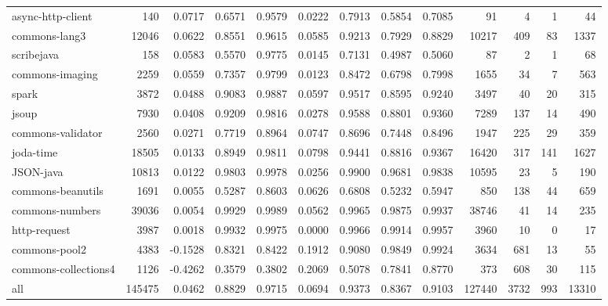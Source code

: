 \begin{table*}
\begin{tabular}{lrrrrrrrrrrrr}
      async-http-client &     140 &      0.0717 &  0.6571 &     0.9579 &     0.0222 &  0.7913 &     0.5854 &   0.7085 &      91 &     4 &    1 &     44 \\
          commons-lang3 &   12046 &      0.0622 &  0.8551 &     0.9615 &     0.0585 &  0.9213 &     0.7929 &   0.8829 &   10217 &   409 &   83 &   1337 \\
             scribejava &     158 &      0.0583 &  0.5570 &     0.9775 &     0.0145 &  0.7131 &     0.4987 &   0.5060 &      87 &     2 &    1 &     68 \\
        commons-imaging &    2259 &      0.0559 &  0.7357 &     0.9799 &     0.0123 &  0.8472 &     0.6798 &   0.7998 &    1655 &    34 &    7 &    563 \\
                  spark &    3872 &      0.0488 &  0.9083 &     0.9887 &     0.0597 &  0.9517 &     0.8595 &   0.9240 &    3497 &    40 &   20 &    315 \\
                  jsoup &    7930 &      0.0408 &  0.9209 &     0.9816 &     0.0278 &  0.9588 &     0.8801 &   0.9360 &    7289 &   137 &   14 &    490 \\
      commons-validator &    2560 &      0.0271 &  0.7719 &     0.8964 &     0.0747 &  0.8696 &     0.7448 &   0.8496 &    1947 &   225 &   29 &    359 \\
              joda-time &   18505 &      0.0133 &  0.8949 &     0.9811 &     0.0798 &  0.9441 &     0.8816 &   0.9367 &   16420 &   317 &  141 &   1627 \\
              JSON-java &   10813 &      0.0122 &  0.9803 &     0.9978 &     0.0256 &  0.9900 &     0.9681 &   0.9838 &   10595 &    23 &    5 &    190 \\
      commons-beanutils &    1691 &      0.0055 &  0.5287 &     0.8603 &     0.0626 &  0.6808 &     0.5232 &   0.5947 &     850 &   138 &   44 &    659 \\
        commons-numbers &   39036 &      0.0054 &  0.9929 &     0.9989 &     0.0562 &  0.9965 &     0.9875 &   0.9937 &   38746 &    41 &   14 &    235 \\
           http-request &    3987 &      0.0018 &  0.9932 &     0.9975 &     0.0000 &  0.9966 &     0.9914 &   0.9957 &    3960 &    10 &    0 &     17 \\
          commons-pool2 &    4383 &     -0.1528 &  0.8321 &     0.8422 &     0.1912 &  0.9080 &     0.9849 &   0.9924 &    3634 &   681 &   13 &     55 \\
   commons-collections4 &    1126 &     -0.4262 &  0.3579 &     0.3802 &     0.2069 &  0.5078 &     0.7841 &   0.8770 &     373 &   608 &   30 &    115 \\
                    all &  145475 &      0.0462 &  0.8829 &     0.9715 &     0.0694 &  0.9373 &     0.8367 &   0.9103 &  127440 &  3732 &  993 &  13310 \\
\bottomrule
\end{tabular}
\end{table*}
